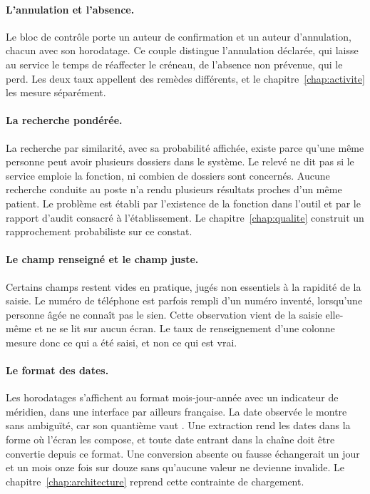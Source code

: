 \paragraph{L'annulation et l'absence.} Le bloc de contrôle porte un auteur de confirmation et un
auteur d'annulation, chacun avec son horodatage. Ce couple distingue
l'annulation déclarée, qui laisse au service le temps de réaffecter le créneau, de l'absence non
prévenue, qui le perd. Les deux taux appellent des remèdes différents, et le
chapitre~\ref{chap:activite} les mesure séparément.

\paragraph{La recherche pondérée.} La recherche par similarité, avec sa probabilité affichée, existe
parce qu'une même personne peut avoir plusieurs dossiers dans le système. Le relevé ne dit pas si le service emploie
la fonction, ni combien de dossiers sont concernés. Aucune recherche conduite au poste n'a rendu
plusieurs résultats proches d'un même patient. Le problème est
établi par l'existence de la fonction dans l'outil et par le rapport d'audit consacré à
l'établissement. Le chapitre~\ref{chap:qualite} construit un rapprochement probabiliste sur ce
constat.

\paragraph{Le champ renseigné et le champ juste.} Certains champs restent vides en pratique, jugés
non essentiels à la rapidité de la saisie. Le numéro de téléphone est parfois rempli d'un numéro
inventé, lorsqu'une personne âgée ne connaît pas le sien. Cette
observation vient de la saisie elle-même et ne se lit sur aucun écran. Le taux de renseignement
d'une colonne mesure donc ce qui a été saisi, et non ce qui est vrai.

\paragraph{Le format des dates.} Les horodatages s'affichent au format mois-jour-année avec un
indicateur de méridien, dans une interface par ailleurs française. La date
observée le montre sans ambiguïté, car son quantième vaut . Une extraction rend les dates
dans la forme où l'écran les compose, et toute date entrant dans la chaîne doit être convertie
depuis ce format. Une conversion absente ou fausse échangerait un jour et un mois onze fois sur
douze sans qu'aucune valeur ne devienne invalide. Le chapitre~\ref{chap:architecture} reprend cette
contrainte de chargement.

